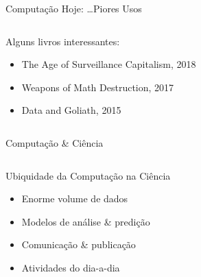 \documentclass[10pt, compress, aspectratio=169, xcolor={table,usenames,dvipsnames}]{beamer}
\begin{document}
\begin{frame}[label={sec:orge866d75}]{Computação Hoje: \dots{}Piores Usos}
\begin{columns}
\begin{column}{0.5\columnwidth}
Alguns \alert{livros interessantes}:
\begin{itemize}
\item \alert{The Age of Surveillance Capitalism}, 2018
\item \alert{Weapons of Math Destruction}, 2017
\item \alert{Data and Goliath}, 2015
\end{itemize}
\end{column}
\end{columns}
\end{frame}

\begin{frame}[label={sec:org3757282}]{Computação \& Ciência}
\begin{columns}
\begin{column}{0.5\columnwidth}
\begin{block}{\alert{Ubiquidade} da Computação na Ciência}
\begin{itemize}
\item Enorme \alert{volume de dados}
\item Modelos de \alert{análise} \& \alert{predição}
\item \alert{Comunicação} \& \alert{publicação}
\item Atividades do \alert{dia-a-dia}
\end{itemize}
\end{block}
\end{column}
\begin{column}{0.5\columnwidth}


\end{column}
\end{columns}
\end{frame}
\end{document}
